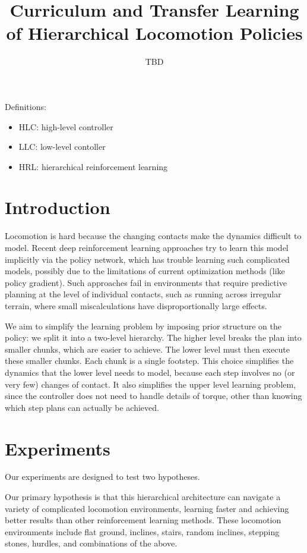 \documentclass[a4paper]{article}
\title{Curriculum and Transfer Learning of Hierarchical Locomotion Policies}
\author{TBD}
\begin{document}
\maketitle

Definitions:
\begin{itemize}
  \item HLC: high-level controller
  \item LLC: low-level contoller
  \item HRL: hierarchical reinforcement learning
\end{itemize}

\section{Introduction}

Locomotion is hard because the changing contacts make the dynamics difficult to model.
Recent deep reinforcement learning approaches try to learn this model implicitly via the policy network, which has trouble learning such complicated models, possibly due to the limitations of current optimization methods (like policy gradient).
Such approaches fail in environments that require predictive planning at the level of individual contacts, such as running across irregular terrain, where small miscalculations have disproportionally large effects.

We aim to simplify the learning problem by imposing prior structure on the policy: we split it into a two-level hierarchy.
The higher level breaks the plan into smaller chunks, which are easier to achieve.
The lower level must then execute these smaller chunks.
Each chunk is a single footstep.
This choice simplifies the dynamics that the lower level needs to model, because each step involves no (or very few) changes of contact.
It also simplifies the upper level learning problem, since the controller does not need to handle details of torque, other than knowing which step plans can actually be achieved.

\section{Experiments}

Our experiments are designed to test two hypotheses.

Our primary hypothesis is that this hierarchical architecture can navigate a variety of complicated locomotion environments, learning faster and achieving better results than other reinforcement learning methods.
These locomotion environments include flat ground, inclines, stairs, random inclines, stepping stones, hurdles, and combinations of the above.
\end{document}
